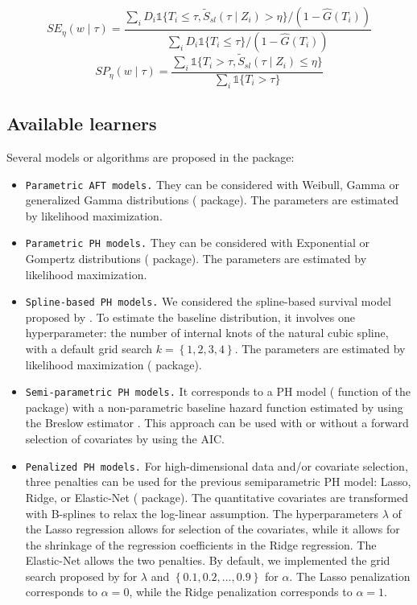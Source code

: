 \[ SE_\eta(w \mid \tau) = \frac{ \sum_i D_i \mathbb{1}\lbrace T_i \leq \tau , \tilde{S}_{sl}( \tau \mid Z_i) > \eta \rbrace / (1 - \hat{G}(T_i)) }{ \sum_i D_i \mathbb{1}\lbrace T_i \leq \tau \rbrace / (1 - \hat{G}(T_i))}\]
\[SP_\eta(w \mid \tau) = \frac{ \sum_i  \mathbb{1}\lbrace T_i > \tau , \tilde{S}_{sl}( \tau \mid Z_i) \leq \eta \rbrace }{ \sum_i \mathbb{1}\lbrace T_i > \tau \rbrace } \]

\hypertarget{available-learners}{%
\subsection{Available learners}\label{available-learners}}

Several models or algorithms are proposed in the  package:

\begin{itemize}
\item
  \texttt{Parametric\ AFT\ models.} They can be considered with Weibull, Gamma or generalized Gamma distributions ( package). The parameters are estimated by likelihood maximization.
\item
  \texttt{Parametric\ PH\ models.} They can be considered with Exponential or Gompertz distributions ( package). The parameters are estimated by likelihood maximization.
\item
  \texttt{Spline-based\ PH\ models.} We considered the spline-based survival model proposed by \citet{royston_flexible_2002}. To estimate the baseline distribution, it involves one hyperparameter: the number of internal knots of the natural cubic spline, with a default grid search \(k = \left \lbrace 1, 2, 3, 4 \right \rbrace\). The parameters are estimated by likelihood maximization ( package).
\item
  \texttt{Semi-parametric\ PH\ models.} It corresponds to a PH model ( function of the  package) with a non-parametric baseline hazard function estimated by using the Breslow estimator \citep{linBreslowEstimator2007}. This approach can be used with or without a forward selection of covariates by using the AIC.
\item
  \texttt{Penalized\ PH\ models.} For high-dimensional data and/or covariate selection, three penalties can be used for the previous semiparametric PH model: Lasso, Ridge, or Elastic-Net ( package). The quantitative covariates are transformed with B-splines to relax the log-linear assumption. The hyperparameters \(\lambda\) of the Lasso regression allows for selection of the covariates, while it allows for the shrinkage of the regression coefficients in the Ridge regression. The Elastic-Net allows the two penalties. By default, we implemented the grid search proposed by \citet{simon_2011_ElasticNet_Cox} for \(\lambda\) and \(\left \lbrace 0.1, 0.2, ..., 0.9 \right \rbrace\) for \(\alpha\). The Lasso penalization corresponds to \(\alpha=0\), while the Ridge penalization corresponds to \(\alpha=1\).

\end{itemize}
